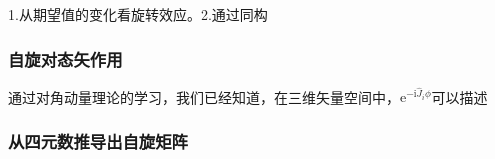 
\begin{issues}
\issueDraft
1.从期望值的变化看旋转效应。2.通过同构
\end{issues}

\subsubsection{自旋对态矢作用}
 通过对角动量理论的学习，我们已经知道，在三维矢量空间中，$\mathrm e^{-\mathrm i\hat J_i\phi}$可以描述
\subsubsection{从四元数推导出自旋矩阵}
